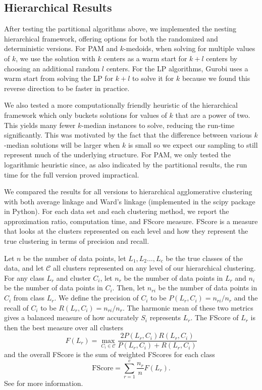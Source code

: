 \documentclass[conference, 10pt, final]{IEEEtran}
\begin{document}
\subsection{Hierarchical Results}
After testing the partitional algorithms above, we implemented the nesting hierarchical framework, offering options for both the randomized and deterministic versions. For PAM and $k$-medoids, when solving for multiple values of $k$, we use the solution with $k$ centers as a warm start for $k+l$ centers by choosing an additional random $l$ centers. For the LP algorithms, Gurobi uses a warm start from solving the LP for $k+l$ to solve it for $k$ because we found this reverse direction to be faster in practice. 

We also tested a more computationally friendly heuristic of the hierarchical framework which only buckets solutions for values of $k$ that are a power of two. This yields many fewer $k$-median instances to solve, reducing the run-time significantly. This was motivated by the fact that the difference between various $k$-median solutions will be larger when $k$ is small so we expect our sampling to still represent much of the underlying structure. For PAM, we only tested the logarithmic heuristic since, as also indicated by the partitional results, the run time for the full version proved impractical. 

We compared the results for all versions to hierarchical agglomerative clustering with both average linkage and Ward's linkage (implemented in the scipy package in Python). 
For each data set and each clustering method, we report the approximation ratio, computation time, and FScore measure.  FScore is a measure that looks at the clusters represented on each level and how they represent the true clustering in terms of precision and recall. 

Let $n$ be the number of data points, let $L_1, L_2 \ldots, L_c$ be the true classes of the data, and let $\mathcal{C}$ all clusters represented on any level of our hierarchical clustering. For any class $L_r$ and cluster $C_i$, let $n_r$ be the number of data points in $L_r$ and $n_i$ be the number of data points in $C_i$. Then, let $n_{ri}$ be the number of data points in $C_i$ from class $L_r$. We define the precision of $C_i$ to be $P(L_r, C_i) = n_{ri}/n_r$ and the recall of $C_i$ to be $R(L_r, C_i) = n_{ri}/n_r$. The harmonic mean of these two metrics gives a balanced measure of how accurately $S_i$ represents $L_r$. The FScore of $L_r$ is then the best measure over all clusters
\begin{equation}
 F(L_r) = \max_{C_i \in \mathcal{C}}  \frac{ 2 P(L_r, C_i)  R(L_r, C_i)}{ P(L_r, C_i) + R(L_r, C_i)} 
\end{equation}
and the overall FScore is the sum of weighted FScores for each class
\begin{equation}
\mathrm{FScore} = \sum_{r=1}^c \frac{n_r}{n} F(L_r).
\end{equation}
See \cite{Larsen} for more information. 
\end{document}
